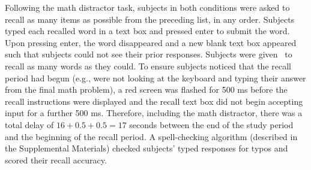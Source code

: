 \documentclass[man,natbib,floatsintext]{apa6} %
\begin{document}
Following the math distractor task, subjects in both conditions were asked to recall as many items as possible from the preceding list, in any order. Subjects typed each recalled word in a text box and pressed enter to submit the word. Upon pressing enter, the word disappeared and a new blank text box appeared such that subjects could not see their prior responses. Subjects were given \recalltime~to recall as many words as they could. To ensure subjects noticed that the recall period had begun (e.g., were not looking at the keyboard and typing their answer from the final math problem), a red screen was flashed for 500 ms before the recall instructions were displayed and the recall text box did not begin accepting input for a further 500 ms. Therefore, including the math distractor, there was a total delay of $16+0.5+0.5=17$ seconds between the end of the study period and the beginning of the recall period. A spell-checking algorithm (described in the Supplemental Materials) checked subjects' typed responses for typos and scored their recall accuracy.
\end{document}
